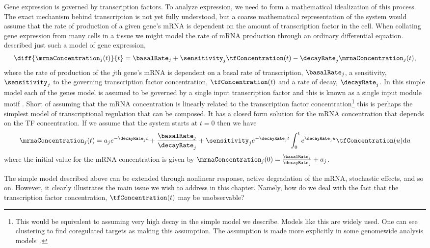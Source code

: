 \documentclass{article}
\begin{document}
Gene expression is governed by transcription factors. To analyze
expression, we need to form a mathematical idealization of this
process. The exact mechanism behind transcription is not yet fully
understood, but a coarse mathematical representation of the system
would assume that the rate of production of a given gene's mRNA is
dependent on the amount of transcription factor in the cell. When
collating gene expression from many cells in a tissue we might model
the rate of mRNA production through an ordinary differential
equation. \cite{Barenco:ranked06} described just such a model of gene
expression,
\begin{equation}
\diff{\mrnaConcentration_j(t)}{t} = \basalRate_j + \sensitivity_j \tfConcentration(t) -\decayRate_j \mrnaConcentration_j(t), \label{eq:differentialEquation}
\end{equation}
where the rate of production of the $j$th gene's mRNA is dependent on
a basal rate of transcription, $\basalRate_j$, a sensitivity,
$\sensitivity_j$ to the governing transcription factor concentration,
$\tfConcentration(t)$ and a rate of decay, $\decayRate_j$. In this
simple model each of the genes model is assumed to be governed by a
single input transcription factor and this is known as a single input
module motif \citep{Alon:systems06}. Short of assuming that the mRNA
concentration is linearly related to the transcription factor
concentration\footnote{This would be equivalent to assuming very high
  decay in the simple model we describe. Models like this
  are widely used. One can see clustering to find coregulated targets
  as making this assumption. The assumption is made more explicitly in
  some genomewide analysis models~\citep{Sanguinetti:chipvar06,Sanguinetti:chipdyno06}.} this is
perhaps the simplest model of transcriptional regulation that can be
composed. It has a closed form solution for the mRNA concentration
that depends on the TF concentration. If we assume that the system
starts at $t=0$ then we have
\begin{equation}
\mrnaConcentration_j(t) = a_je^{-\decayRate_{j}t} +
\frac{\basalRate_j}{\decayRate_j} +
\sensitivity_je^{-\decayRate_{j}t}\int_0^t
e^{\decayRate_{j}u}\tfConcentration(u) \mathrm{d}u 
\label{eq:differentialEquationSoln}
\end{equation}
where the initial value for the mRNA concentration is given by
$\mrnaConcentration_j(0)=\frac{\basalRate_j}{\decayRate_j}+a_j$.

The simple model described above can be extended through nonlinear
response, active degradation of the mRNA, stochastic effects, and so
on. However, it clearly illustrates the main issue we wish to address
in this chapter. Namely, how do we deal with the fact that the
transcription factor concentration, $\tfConcentration(t)$ may be
unobservable? 
\end{document}
